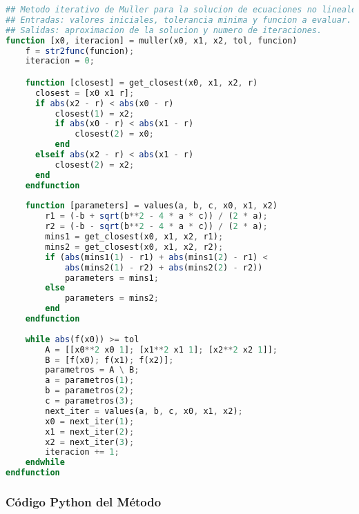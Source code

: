 \documentclass[12pt]{article}
\begin{document}
\begin{lstlisting}[language=OCTAVE, caption=Implementación del método de Müller en Octave]
## Metodo iterativo de Muller para la solucion de ecuaciones no lineales.
## Entradas: valores iniciales, tolerancia minima y funcion a evaluar.
## Salidas: aproximacion de la solucion y numero de iteraciones.
function [x0, iteracion] = muller(x0, x1, x2, tol, funcion)
    f = str2func(funcion);
    iteracion = 0;

    function [closest] = get_closest(x0, x1, x2, r)
      closest = [x0 x1 r];
      if abs(x2 - r) < abs(x0 - r)
          closest(1) = x2;
          if abs(x0 - r) < abs(x1 - r)
              closest(2) = x0;
          end
      elseif abs(x2 - r) < abs(x1 - r)
          closest(2) = x2;
      end
    endfunction
    
    function [parameters] = values(a, b, c, x0, x1, x2)
        r1 = (-b + sqrt(b**2 - 4 * a * c)) / (2 * a);
        r2 = (-b - sqrt(b**2 - 4 * a * c)) / (2 * a);
        mins1 = get_closest(x0, x1, x2, r1);
        mins2 = get_closest(x0, x1, x2, r2);
        if (abs(mins1(1) - r1) + abs(mins1(2) - r1) <
            abs(mins2(1) - r2) + abs(mins2(2) - r2))
            parameters = mins1;
        else
            parameters = mins2;
        end
    endfunction
    
    while abs(f(x0)) >= tol
        A = [[x0**2 x0 1]; [x1**2 x1 1]; [x2**2 x2 1]];
        B = [f(x0); f(x1); f(x2)];
        parametros = A \ B;
        a = parametros(1);
        b = parametros(2);
        c = parametros(3);
        next_iter = values(a, b, c, x0, x1, x2);
        x0 = next_iter(1);
        x1 = next_iter(2);
        x2 = next_iter(3);
        iteracion += 1;
    endwhile
endfunction

\end{lstlisting}

\subsubsection{Código Python del Método}
\end{document}
